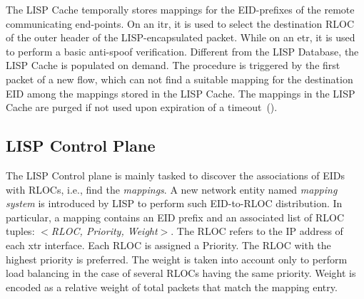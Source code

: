 The LISP Cache temporally stores mappings for the EID-prefixes of the remote communicating end-points. On an \acrshort{itr}, it is used to select the destination RLOC of the outer header of the LISP-encapsulated packet. While on an \acrshort{etr}, it is used to perform a basic anti-spoof verification. Different from the LISP Database, the LISP Cache is populated on demand. The procedure is triggered by the first packet of a new flow, which can not find a suitable mapping for the destination EID among the mappings stored in the LISP Cache. The mappings in the LISP Cache are purged if not used upon expiration of a timeout~(\cite{lispCacheCost,lispCacheDive,lispCacheLRU,lispCacheModel}).

\subsection{LISP Control Plane}
\label{sec:control_plane}

The LISP Control plane is mainly tasked to discover the associations of EIDs with RLOCs, i.e., find the \emph{mappings}. A new network entity named \emph{mapping system} is introduced by LISP to perform such EID-to-RLOC distribution. In particular, a mapping contains an EID prefix and an associated list of RLOC tuples: \emph{$<$RLOC, Priority, Weight$>$}. The RLOC refers to the IP address of each \acrshort{xtr} interface. Each RLOC is assigned a Priority. The RLOC with the highest priority is preferred. %
The weight is taken into account only to perform load balancing in the case of several RLOCs having the same priority. Weight is encoded as a relative weight of total packets that match the mapping entry.

